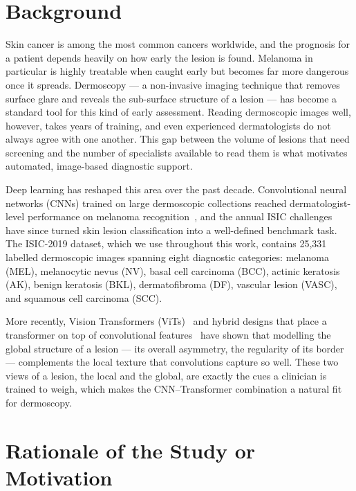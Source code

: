 \section{Background}

Skin cancer is among the most common cancers worldwide, and the prognosis for a
patient depends heavily on how early the lesion is found. Melanoma in
particular is highly treatable when caught early but becomes far more dangerous
once it spreads. Dermoscopy --- a non-invasive imaging technique that removes
surface glare and reveals the sub-surface structure of a lesion --- has become a
standard tool for this kind of early assessment. Reading dermoscopic images
well, however, takes years of training, and even experienced dermatologists do
not always agree with one another. This gap between the volume of lesions that
need screening and the number of specialists available to read them is what
motivates automated, image-based diagnostic support.

Deep learning has reshaped this area over the past decade. Convolutional neural
networks (CNNs) trained on large dermoscopic collections reached
dermatologist-level performance on melanoma recognition~\cite{esteva2017dermatologist},
and the annual ISIC challenges have since turned skin lesion classification into
a well-defined benchmark task. The ISIC-2019 dataset, which we use throughout
this work, contains 25{,}331 labelled dermoscopic images spanning eight
diagnostic categories: melanoma (MEL), melanocytic nevus (NV), basal cell
carcinoma (BCC), actinic keratosis (AK), benign keratosis (BKL),
dermatofibroma (DF), vascular lesion (VASC), and squamous cell carcinoma (SCC).

More recently, Vision Transformers (ViTs)~\cite{dosovitskiy2021vit} and hybrid
designs that place a transformer on top of convolutional
features~\cite{mehta2022mobilevit,li2022efficientformer} have shown that
modelling the global structure of a lesion --- its overall asymmetry, the
regularity of its border --- complements the local texture that convolutions
capture so well. These two views of a lesion, the local and the global, are
exactly the cues a clinician is trained to weigh, which makes the
CNN--Transformer combination a natural fit for dermoscopy.

\section{Rationale of the Study or Motivation}

